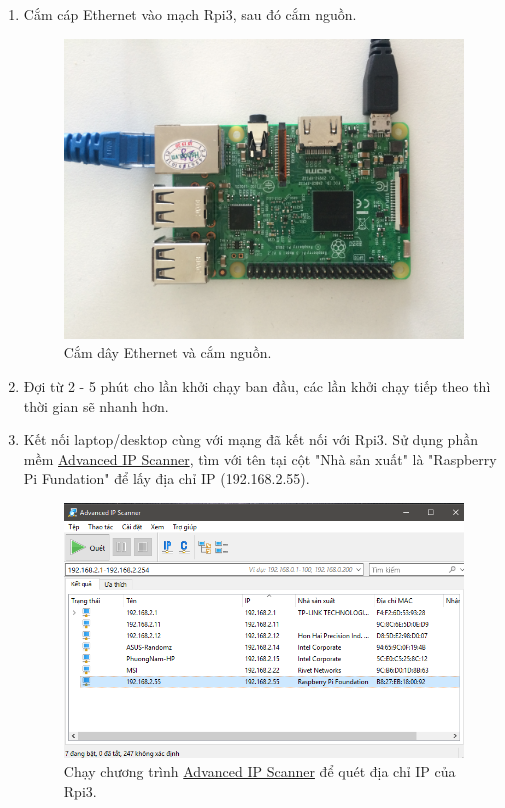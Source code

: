 \begin{enumerate}
\item Cắm cáp Ethernet vào mạch Rpi3, sau đó cắm nguồn.
\begin{center}
\begin{figure}[htp]
\begin{center}
\includegraphics[scale=0.08]{image3/buoc3s10.JPG}
\end{center}
\caption{Cắm dây Ethernet và cắm nguồn.}
\label{refhinh1}
\end{figure}
\end{center}
\item Đợi từ 2 - 5 phút cho lần khởi chạy ban đầu, các lần khởi chạy tiếp theo thì thời gian sẽ nhanh hơn.
\item Kết nối laptop/desktop cùng với mạng đã kết nối với Rpi3. Sử dụng phần mềm \hyperref[scanip]{Advanced IP Scanner}, tìm với tên tại cột "Nhà sản xuất" là "Raspberry Pi Fundation" để lấy địa chỉ IP (192.168.2.55).
\begin{center}
\begin{figure}[htp]
\begin{center}
\includegraphics[scale=0.65]{image3/buoc3s11.png}
\end{center}
\caption{Chạy chương trình \hyperref[scanip]{Advanced IP Scanner} để quét địa chỉ IP của Rpi3.}
\label{refhinh1}
\end{figure}
\end{center}
\end{enumerate}
